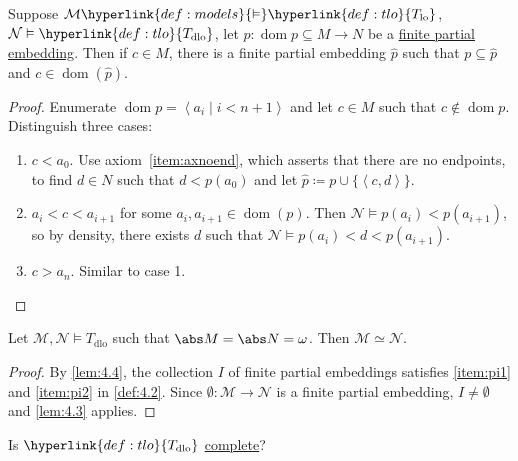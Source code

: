 \documentclass{article}
\let\models\vDash
\DeclareMathOperator{\dom}{dom}
\newcommand{\named}[1]{\textbf{#1}\index{#1}}
\begin{document}
\begin{nlemma}\label{lem:4.4}
  Suppose $\mathcal{M} \hyperlink{def:models}{\models} \hyperlink{def:tlo}{T_{\text{lo}}}$, $\mathcal{N} \models \hyperlink{def:tlo}{T_{\text{dlo}}}$, let $p: \dom p \subseteq M \to N$ be a \hyperlink{def:pe}{finite partial embedding}.
  Then if $c \in M$, there is a finite partial embedding $\hat{p}$ such that $p \subseteq \hat{p}$ and $c \in \dom(\hat{p})$.
\end{nlemma}
\begin{proof}
  Enumerate $\dom p = \left< a_i \mid i < n+1 \right>$ and let $c \in M$ such that $c \not\in \dom p$.
  Distinguish three cases:
  \begin{enumerate}[label=\arabic*.]
    \item $c < a_0$. Use axiom~\ref{item:axnoend}, which asserts that there are no endpoints, to find $d \in N$ such that $d < p(a_0)$ and let $\hat p \coloneqq p \cup \{ \left< c,d \right> \}$.
    \item $a_i < c < a_{i+1}$ for some $a_i, a_{i+1} \in \dom(p)$.
      Then $\mathcal{N} \models p(a_i) < p(a_{i+1})$, so by density, there exists $d$ such that $\mathcal{N} \models p(a_i) < d < p(a_{i+1})$.
     \item $c > a_n$. Similar to case 1. \qedhere
  \end{enumerate}
\end{proof}

\begin{nthm} \label{thm:4.5}
Let $\mathcal{M}, \mathcal{N} \models T_{\text{dlo}}$ such that $\abs M = \abs N = \omega$. Then $\mathcal M \simeq \mathcal N$.
\end{nthm}

\begin{proof}
By \cref{lem:4.4}, the collection $I$ of finite partial embeddings satisfies \ref{item:pi1} and \ref{item:pi2} in \cref{def:4.2}. Since $\emptyset: \mathcal{M} \to \mathcal{N}$ is a finite partial embedding, $I \neq \emptyset$ and \cref{lem:4.3} applies. 
\end{proof}

Is $\hyperlink{def:tlo}{T_{\text{dlo}}}$ \hyperlink{def:complete}{complete}?
\end{document}

